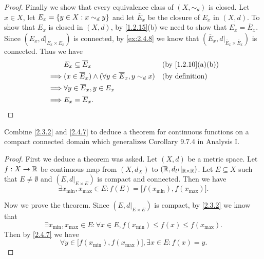 \begin{proof}
  Finally we show that every equivalence class of \((X, \sim_d)\) is closed.
  Let \(x \in X\), let \(E_x = \left\lbrace y \in X : x \sim_d y\right\rbrace\) and let \(\overline{E}_x\) be the closure of \(E_x\) in \((X, d)\).
  To show that \(E_x\) is closed in \((X, d)\), by \cref{1.2.15}(b) we need to show that \(E_x = \overline{E}_x\).
  Since \((E_x, d|_{E_x \times E_x})\) is connected, by \cref{ex:2.4.8} we know that \((\overline{E}_x, d|_{\overline{E}_x \times \overline{E}_x})\) is connected.
  Thus we have
  \begin{align*}
             & E_x \subseteq \overline{E}_x                                            &  & \text{(by \cref{1.2.10}(a)(b))} \\
    \implies & (x \in \overline{E}_x) \land (\forall y \in \overline{E}_x, y \sim_d x) &  & \text{(by definition)}          \\
    \implies & \forall y \in \overline{E}_x, y \in E_x                                                                      \\
    \implies & E_x = \overline{E}_x.
  \end{align*}
\end{proof}

\begin{ex}\label{ex:2.4.10}
  Combine \cref{2.3.2} and \cref{2.4.7} to deduce a theorem for continuous functions on a compact connected domain which generalizes Corollary 9.7.4 in Analysis I.
\end{ex}

\begin{proof}
  First we deduce a theorem was asked.
  Let \((X, d)\) be a metric space.
  Let \(f : X \to \mathbb{R}\) be continuous map from \((X, d_X)\) to \((\mathbb{R}, d_{l^1}|_{\mathbb{R} \times \mathbb{R}})\).
  Let \(E \subseteq X\) such that \(E \neq \emptyset\) and \((E, d|_{E \times E})\) is compact and connected.
  Then we have
  \[
    \exists x_{\min}, x_{\max} \in E : f(E) = \big[f(x_{\min}), f(x_{\max})\big].
  \]

  Now we prove the theorem.
  Since \((E, d|_{E \times E})\) is compact, by \cref{2.3.2} we know that
  \[
    \exists x_{\min}, x_{\max} \in E : \forall x \in E, f(x_{\min}) \leq f(x) \leq f(x_{\max}).
  \]
  Then by \cref{2.4.7} we have
  \[
    \forall y \in \big[f(x_{\min}), f(x_{\max})\big], \exists x \in E : f(x) = y.
  \]
\end{proof}
